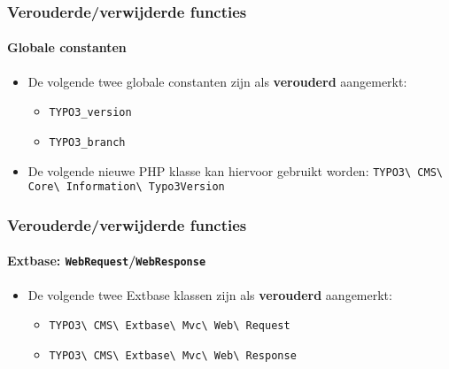 \begin{frame}[fragile]
	\frametitle{Verouderde/verwijderde functies}
	\framesubtitle{Globale constanten}

	\lstset{basicstyle=\smaller\ttfamily}

	\begin{itemize}
		\item De volgende twee globale constanten zijn als \textbf{verouderd} aangemerkt:

			\begin{itemize}
				\item \texttt{TYPO3\_version}
				\item \texttt{TYPO3\_branch}
			\end{itemize}

		\item De volgende nieuwe PHP klasse kan hiervoor gebruikt worden:\newline
			\small
				\texttt{TYPO3\textbackslash
					CMS\textbackslash
					Core\textbackslash
					Information\textbackslash
					Typo3Version}\normalsize

	\end{itemize}

\end{frame}


\begin{frame}[fragile]
	\frametitle{Verouderde/verwijderde functies}
	\framesubtitle{Extbase: \texttt{WebRequest}/\texttt{WebResponse}}

	\begin{itemize}
		\item De volgende twee Extbase klassen zijn als \textbf{verouderd} aangemerkt:
			\begin{itemize}
				\item \texttt{TYPO3\textbackslash
					CMS\textbackslash
					Extbase\textbackslash
					Mvc\textbackslash
					Web\textbackslash
					Request}
				\item \texttt{TYPO3\textbackslash
					CMS\textbackslash
					Extbase\textbackslash
					Mvc\textbackslash
					Web\textbackslash
					Response}
			\end{itemize}

	\end{itemize}

\end{frame}

